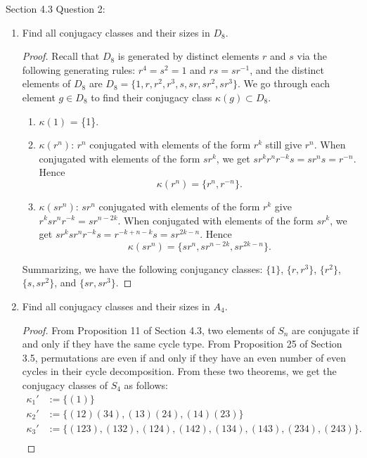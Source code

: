 Section 4.3 Question 2:
\begin{enumerate}
  \item Find all conjugacy classes and their sizes in $D_8$.
    \begin{proof}
      Recall that $D_8$ is generated by distinct elements $r$ and $s$ via
      the following generating rules: $r^4=s^2=1$ and $rs=sr^{-1}$, and the
      distinct elements of $D_8$ are $D_8=\{1,r,r^2,r^3,s,sr,sr^2,sr^3\}$.
      We go through each element $g\in D_8$ to find their conjugacy class
      $\kappa(g)\subset D_8$. \\

      \begin{enumerate}
        \item $\kappa(1)$ = \{1\}.
        \item $\kappa(r^n)$: $r^n$ conjugated with elements of the form $r^k$
          still give $r^n$. When conjugated with elements of the form
          $sr^k$, we get $sr^kr^nr^{-k}s=sr^ns=r^{-n}$. Hence
          \begin{equation*}
            \kappa(r^n) = \{r^n,r^{-n}\}.
          \end{equation*}
        \item $\kappa(sr^n)$: $sr^n$ conjugated with elements of the form $r^k$
          give $r^ksr^nr^{-k}=sr^{n-2k}$.
          When conjugated with elements of the form $sr^k$, we get
          $sr^ksr^nr^{-k}s=r^{-k+n-k}s=sr^{2k-n}$. Hence
          \begin{equation*}
            \kappa(sr^n) = \{sr^n,sr^{n-2k},sr^{2k-n}\}.
          \end{equation*}
      \end{enumerate}

      Summarizing, we have the following conjugancy classes: $\{1\}$,
      $\{r,r^3\}$, $\{r^2\}$, $\{s,sr^2\}$, and $\{sr,sr^3\}$.
    \end{proof}

  \item Find all conjugacy classes and their sizes in $A_4$.
    \begin{proof}
      From Proposition 11 of Section 4.3, two elements of $S_n$ are
      conjugate if and only if they have the same cycle type. From
      Proposition 25 of Section 3.5, permutations are even if and only if
      they have an even number of even cycles in their cycle decomposition.
      From these two theorems, we get the conjugacy classes of $S_4$ as
      follows:
      \begin{align*}
        \kappa_1' &:= \{(1)\} \\
        \kappa_2' &:= \{(12)(34),(13)(24),(14)(23)\} \\
        \kappa_3' &:= \{(123),(132),(124),(142),(134),(143),(234),(243)\}. \\
      \end{align*}


\end{proof}
\end{enumerate}
